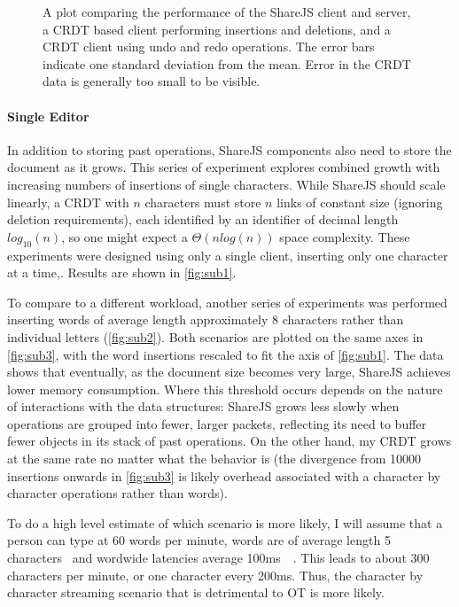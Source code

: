 \documentclass[12pt,a4paper,twoside,openright]{report}
\begin{document}
				\begin{figure}[htb]
					\centering
					
					\caption[Memory Consumption Sanity Check] {A plot comparing the performance of the ShareJS client and server, a CRDT based client performing insertions and deletions, and a CRDT client using undo and redo operations. The error bars indicate one standard deviation from the mean. Error in the CRDT data is generally too small to be visible.}
					\label{fig:sanitycheck}
				\end{figure}
		
			\paragraph{Single Editor} \label{sec:singleeditor}
				In addition to storing past operations, ShareJS components also need to store the document as it grows. This series of experiment explores combined growth with increasing numbers of insertions of single characters. While ShareJS should scale linearly, a CRDT with $n$ characters must store $n$ links of constant size (ignoring deletion requirements), each identified by an identifier of decimal length $log_{10}(n)$, so one might expect a $\Theta (nlog(n))$ space complexity. These experiments were designed using only a single client, inserting only one character at a time,. Results are shown in \ref{fig:sub1}.
					
				To compare to a different workload, another series of experiments was performed inserting words of average length approximately 8 characters rather than individual letters (\ref{fig:sub2}). Both scenarios are plotted on the same axes in \ref{fig:sub3}, with the word insertions rescaled to fit the axis of \ref{fig:sub1}. The data shows that eventually, as the document size becomes very large, ShareJS achieves lower memory consumption. Where this threshold occurs depends on the nature of interactions with the data structures: ShareJS grows less slowly when operations are grouped into fewer, larger packets, reflecting its need to buffer fewer objects in its stack of past operations. On the other hand, my CRDT grows at the same rate no matter what the behavior is (the divergence from 10000 insertions onwards in \ref{fig:sub3} is likely overhead associated with a character by character operations rather than words). 
				
				To do a high level estimate of which scenario is more likely, I will assume that a person can type at 60 words per minute, words are of average length 5 characters~\cite{bochkarev2012average} and wordwide latencies average 100ms~\cite{latencies}~\cite{fccbroadband}. This leads to about 300 characters per minute, or one character every 200ms. Thus, the character by character streaming scenario that is detrimental to OT is more likely.
				
\end{document}
